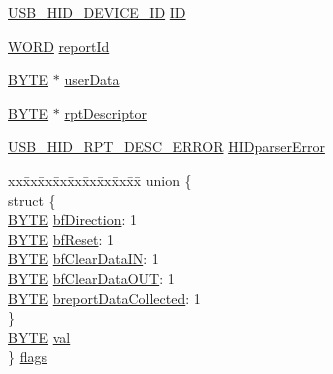 \begin{DoxyCompactItemize}
\item 
\hyperlink{usb__host__hid_8h_abebb66a3f3d163f59e97f148c8458d34}{U\+S\+B\+\_\+\+H\+I\+D\+\_\+\+D\+E\+V\+I\+C\+E\+\_\+\+I\+D} \hyperlink{struct___u_s_b___h_i_d___d_e_v_i_c_e___i_n_f_o_a974c40372ebea7fc5f450d6ab48f2ec3}{I\+D}
\item 
\hyperlink{_generic_type_defs_8h_a2b0e863dadf920709ec53d9088ee7c91}{W\+O\+R\+D} \hyperlink{struct___u_s_b___h_i_d___d_e_v_i_c_e___i_n_f_o_a63c37ea5b6a27dfe69885a6345c138d3}{report\+Id}
\item 
\hyperlink{_generic_type_defs_8h_a4ae1dab0fb4b072a66584546209e7d58}{B\+Y\+T\+E} $\ast$ \hyperlink{struct___u_s_b___h_i_d___d_e_v_i_c_e___i_n_f_o_a4b581b695075f88f61141ae73d978b57}{user\+Data}
\item 
\hyperlink{_generic_type_defs_8h_a4ae1dab0fb4b072a66584546209e7d58}{B\+Y\+T\+E} $\ast$ \hyperlink{struct___u_s_b___h_i_d___d_e_v_i_c_e___i_n_f_o_a1caeb2164d39ada34140bbcb7268f146}{rpt\+Descriptor}
\item 
\hyperlink{usb__host__hid__parser_8h_afc867ea57aea7da3322d924857a58e9a}{U\+S\+B\+\_\+\+H\+I\+D\+\_\+\+R\+P\+T\+\_\+\+D\+E\+S\+C\+\_\+\+E\+R\+R\+O\+R} \hyperlink{struct___u_s_b___h_i_d___d_e_v_i_c_e___i_n_f_o_a9517adb21706f2727bf2abc7f3e0a94a}{H\+I\+Dparser\+Error}
\item 
\begin{tabbing}
xx\=xx\=xx\=xx\=xx\=xx\=xx\=xx\=xx\=\kill
union \{\\
\>struct \{\\
\>\>\hyperlink{_generic_type_defs_8h_a4ae1dab0fb4b072a66584546209e7d58}{BYTE} \hyperlink{struct___u_s_b___h_i_d___d_e_v_i_c_e___i_n_f_o_a643a968c6e6eb92cbe3bbc1b93a03d85}{bfDirection}: 1\\
\>\>\hyperlink{_generic_type_defs_8h_a4ae1dab0fb4b072a66584546209e7d58}{BYTE} \hyperlink{struct___u_s_b___h_i_d___d_e_v_i_c_e___i_n_f_o_aa32abb25eba481ead725bd3650ac396d}{bfReset}: 1\\
\>\>\hyperlink{_generic_type_defs_8h_a4ae1dab0fb4b072a66584546209e7d58}{BYTE} \hyperlink{struct___u_s_b___h_i_d___d_e_v_i_c_e___i_n_f_o_a23d5622b06c6267c1c5d431a13d2bea4}{bfClearDataIN}: 1\\
\>\>\hyperlink{_generic_type_defs_8h_a4ae1dab0fb4b072a66584546209e7d58}{BYTE} \hyperlink{struct___u_s_b___h_i_d___d_e_v_i_c_e___i_n_f_o_ae5a198abfbb0ec12155c98287b8337a4}{bfClearDataOUT}: 1\\
\>\>\hyperlink{_generic_type_defs_8h_a4ae1dab0fb4b072a66584546209e7d58}{BYTE} \hyperlink{struct___u_s_b___h_i_d___d_e_v_i_c_e___i_n_f_o_a75b5a8c5ef9f973aeb04abf682dc7c90}{breportDataCollected}: 1\\
\>\} \\
\>\hyperlink{_generic_type_defs_8h_a4ae1dab0fb4b072a66584546209e7d58}{BYTE} \hyperlink{struct___u_s_b___h_i_d___d_e_v_i_c_e___i_n_f_o_a5986ea8162aa0f6608b36b20964044dd}{val}\\
\} \hyperlink{struct___u_s_b___h_i_d___d_e_v_i_c_e___i_n_f_o_af9591d9f514890375249e938d326d375}{flags}\\


\end{tabbing}
\end{DoxyCompactItemize}
